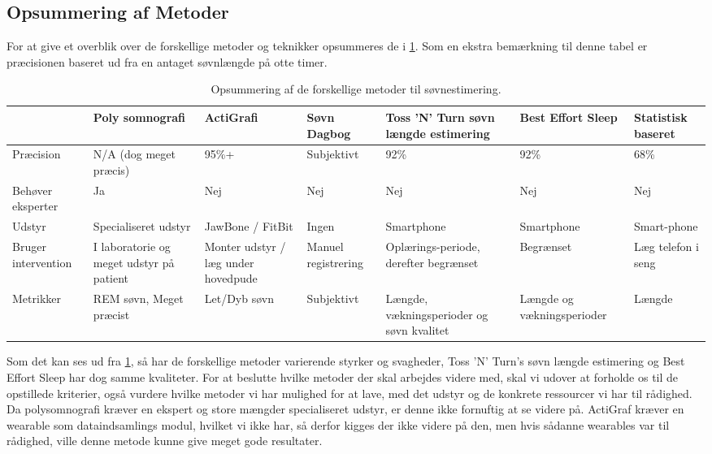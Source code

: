 \subsection{Opsummering af Metoder}
For at give et overblik over de forskellige metoder og teknikker opsummeres de i \cref{tab:opsummeringMetoder}.
Som en ekstra bemærkning til denne tabel er præcisionen baseret ud fra en antaget søvnlængde på otte timer. 

\begin{table}[h]
\begin{tabular}{|p{2cm}|p{2cm}|p{2cm}|p{2cm}|p{2cm}|p{2cm}|p{1.5cm}|}
\hline & Poly somnografi & ActiGrafi & Søvn Dagbog & Toss 'N' Turn søvn længde estimering & Best Effort Sleep  & Statistisk baseret\\ 
\hline Præcision & N/A (dog meget præcis) & 95\%+ & Subjektivt & 92\% & 92\% & 68\%\\ 
\hline Behøver eksperter & Ja & Nej & Nej & Nej & Nej & Nej \\ 
\hline Udstyr & Specialiseret udstyr & JawBone / FitBit & Ingen & Smartphone & Smartphone & Smart-phone \\ 
\hline Bruger intervention	& I laboratorie og meget udstyr på patient	& Monter udstyr / læg under hovedpude & Manuel registrering  & Oplærings-periode, derefter begrænset & Begrænset & Læg telefon i seng \\ 
\hline Metrikker & REM søvn, Meget præcist	& Let/Dyb søvn & Subjektivt & Længde, vækningsperioder og søvn kvalitet & Længde og vækningsperioder & Længde \\ 
\hline 
\end{tabular}
\caption{Opsummering af de forskellige metoder til søvnestimering.}
\label{tab:opsummeringMetoder}
\end{table}

Som det kan ses ud fra \cref{tab:opsummeringMetoder}, så har de forskellige metoder varierende styrker og svagheder, Toss 'N' Turn's søvn længde estimering og Best Effort Sleep har dog samme kvaliteter.
For at beslutte hvilke metoder der skal arbejdes videre med, skal vi udover at forholde os til de opstillede kriterier, også vurdere hvilke metoder vi har mulighed for at lave, med det udstyr og de konkrete ressourcer vi har til rådighed.
Da polysomnografi kræver en ekspert og store mængder specialiseret udstyr, er denne ikke fornuftig at se videre på.
ActiGraf kræver en wearable som dataindsamlings modul, hvilket vi ikke har, så derfor kigges der ikke videre på den, men hvis sådanne wearables var til rådighed, ville denne metode kunne give meget gode resultater.

